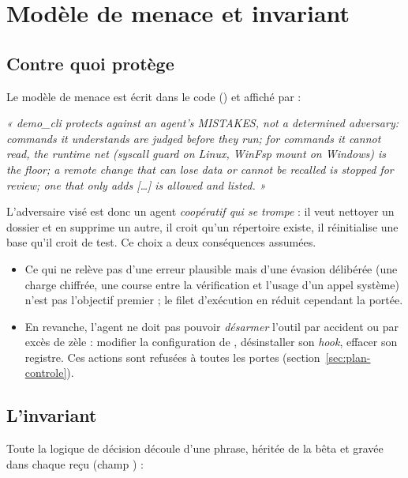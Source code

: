 \section{Modèle de menace et invariant}
\label{sec:menace}

\subsection{Contre quoi \texorpdfstring{\demo}{demo\_cli} protège}
Le modèle de menace est écrit dans le code () et affiché par
 :

\begin{encadre}
\textit{« demo\_cli protects against an agent's MISTAKES, not a determined adversary:
commands it understands are judged before they run; for commands it cannot read, the
runtime net (syscall guard on Linux, WinFsp mount on Windows) is the floor; a remote change
that can lose data or cannot be recalled is stopped for review; one that only adds [\ldots]
is allowed and listed. »}
\end{encadre}

L'adversaire visé est donc un agent \emph{coopératif qui se trompe} : il veut nettoyer un
dossier et en supprime un autre, il croit qu'un répertoire existe, il réinitialise une base
qu'il croit de test. Ce choix a deux conséquences assumées.
\begin{itemize}
  \item Ce qui ne relève pas d'une erreur plausible mais d'une évasion délibérée (une charge
    chiffrée, une course entre la vérification et l'usage d'un appel système) n'est pas
    l'objectif premier ; le filet d'exécution en réduit cependant la portée.
  \item En revanche, l'agent ne doit pas pouvoir \emph{désarmer} l'outil par accident ou par
    excès de zèle : modifier la configuration de \demo{}, désinstaller son \textit{hook},
    effacer son registre. Ces actions sont refusées à toutes les portes
    (section~\ref{sec:plan-controle}).
\end{itemize}

\subsection{L'invariant}
Toute la logique de décision découle d'une phrase, héritée de la bêta et gravée dans chaque
reçu (champ ) :

